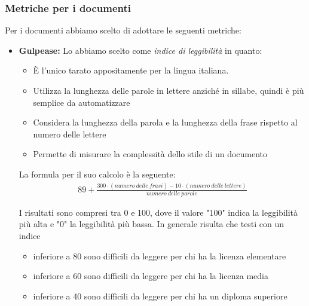 \documentclass[a4paper]{article}
\begin{document}
				
			\subsubsection{Metriche per i documenti}
				Per i documenti abbiamo scelto di adottare le seguenti metriche: 
				
				\begin{itemize}
				\item \textbf{Gulpease:} Lo abbiamo scelto come \emph{indice di leggibilità} in quanto:
				\begin{itemize}
					\item È l'unico tarato appositamente per la lingua italiana.
					\item Utilizza la lunghezza delle parole in lettere anziché in sillabe, quindi è più semplice da automatizzare
					\item Considera la lunghezza della parola e la lunghezza della frase rispetto al numero delle lettere
					\item Permette di misurare la complessità dello stile di un documento
				
				\end{itemize}
				La formula per il suo calcolo è la seguente:
				\begin{align}
					89+\frac{300\cdot(numero\ delle\ frasi)-10\cdot(numero\ delle\ lettere)}{numero\ delle\ parole}
				\end{align}
				
				I risultati sono compresi tra 0 e 100, dove il valore "100" indica la leggibilità più alta e "0" la leggibilità
				più bassa. In generale risulta che testi con un indice
				\begin{itemize}
					\item inferiore a 80 sono difficili da leggere per chi ha la licenza elementare
					\item inferiore a 60 sono difficili da leggere per chi ha la licenza media
					\item inferiore a 40 sono difficili da leggere per chi ha un diploma superiore
				\end{itemize}
	

\end{itemize}
\end{document}
